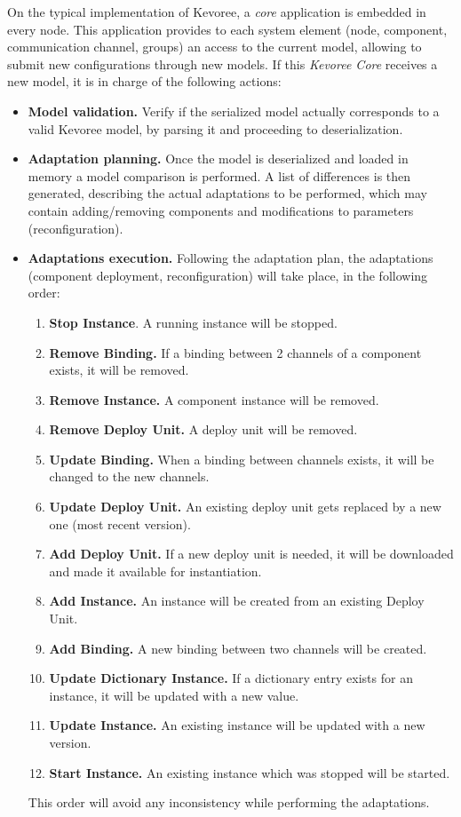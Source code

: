 On the typical implementation of Kevoree, a \textit{core} application is embedded in every node. 
This application provides to each system element (node, component, communication channel, groups) an access to the current model, allowing to submit new configurations through new models.
If this \textit{Kevoree Core} receives a new model, it is in charge of the following actions:

\begin{itemize}
	\item \textbf{Model validation.} Verify if the serialized model actually corresponds to a valid Kevoree model, by parsing it and proceeding to deserialization.
	\item \textbf{Adaptation planning.} Once the model is deserialized and loaded in memory a model comparison is performed. A list of differences is then generated, describing the actual adaptations to be performed, which may contain adding/removing components and modifications to parameters (reconfiguration).
	\item \textbf{Adaptations execution.} Following the adaptation plan, the adaptations (component deployment, reconfiguration) will take place, in the following order:
	\begin{enumerate}
		\item \textbf{Stop Instance}. A running instance will be stopped.
		\item \textbf{Remove Binding.} If a binding between 2 channels of a component exists, it will be removed.
		\item \textbf{Remove Instance.} A component instance will be removed.
		\item \textbf{Remove Deploy Unit.} A deploy unit will be removed.
		\item \textbf{Update Binding.} When a binding between channels exists, it will be changed to the new channels.
		\item \textbf{Update Deploy Unit.} An existing deploy unit gets replaced by a new one (most recent version).
		\item \textbf{Add Deploy Unit.} If a new deploy unit is needed, it will be downloaded and made it available for instantiation.
		\item \textbf{Add Instance.} An instance will be created from an existing Deploy Unit.
		\item \textbf{Add Binding.} A new binding between two channels will be created.
		\item \textbf{Update Dictionary Instance.} If a dictionary entry exists for an instance, it will be updated with a new value.
		\item \textbf{Update Instance.} An existing instance will be updated with a new version.
		\item \textbf{Start Instance.} An existing instance which was stopped will be started.
	\end{enumerate}
	This order will avoid any inconsistency while performing the adaptations.
\end{itemize}

